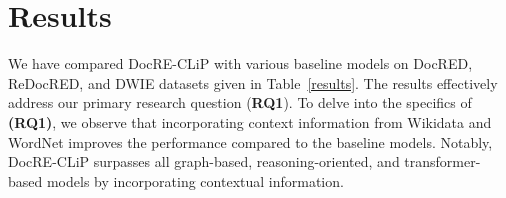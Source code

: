 \documentclass[letterpaper]{article} %
\begin{document}



\section{Results}
We have compared DocRE-CLiP with various baseline models on DocRED, ReDocRED, and DWIE datasets given in Table~\ref{results}. The results effectively address our primary research question (\textbf{RQ1}). To delve into the specifics of \textbf{(RQ1)}, we observe that incorporating context information from Wikidata and WordNet improves the performance compared to the baseline models. Notably, DocRE-CLiP surpasses all graph-based, reasoning-oriented, and transformer-based models by incorporating contextual information.
\end{document}
